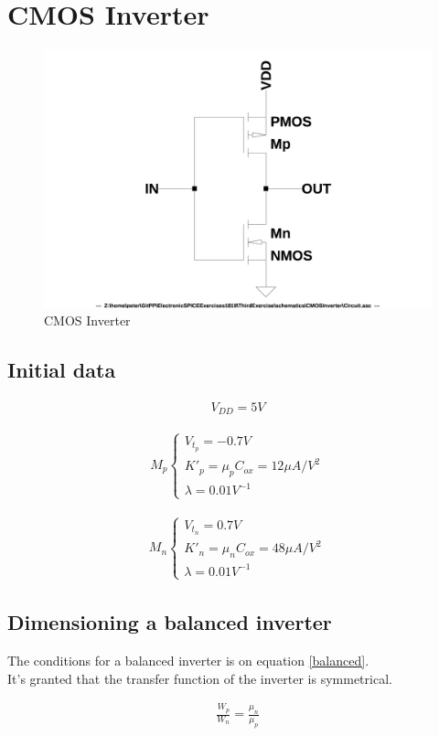 \chapter{CMOS Inverter}
\begin{figure}[h]
  \centering
  \includegraphics[width=12cm]{schematics/CMOSInverter/Circuit.jpg}
  \caption{CMOS Inverter}
  \label{CMOSInverterCircuit}
\end{figure}
  
\section{Initial data} \label{CIInitialData}
\begin{align}
V_{DD} = 5V
\end{align}

\begin{align} \label{mp}
M_p \left\{
\begin{array}{l}
V_{t_p} = -0.7V\\
K'_p = \mu _p C_{ox} = 12 \mu A / V^2\\
\lambda = 0.01 V^{-1}
\end{array}
\right.
\end{align}

\begin{align} \label{mn}
M_n \left\{
\begin{array}{l}
V_{t_n} = 0.7V\\
K'_n = \mu _n C_{ox} = 48 \mu A / V^2\\
\lambda = 0.01 V^{-1}
\end{array}
\right.
\end{align}

\section{Dimensioning a balanced inverter}
The conditions for a balanced inverter is on equation \ref{balanced}.\\
It's granted that the transfer function of the inverter is symmetrical.\par
\begin{align}
\frac{W_p}{W_n} = \frac{\mu _n}{\mu _p} \label{balanced}
\end{align}

